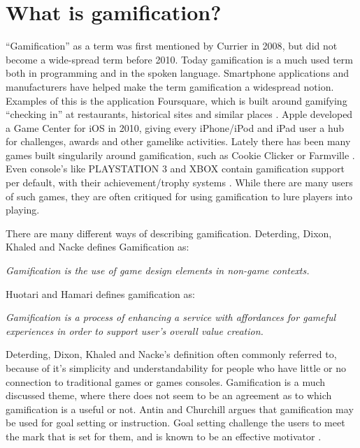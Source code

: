 \section{What is gamification?}
\label{sec:gamification}

``Gamification'' as a term was first mentioned by Currier in 2008\cite{gamificationcurrier}, but did not become a wide-spread term before 2010. Today gamification is a much used term both in programming and in the spoken language. Smartphone applications and manufacturers have helped make the term gamification a widespread notion. Examples of this is the application Foursquare, which is built around gamifying ``checking in'' at restaurants, historical sites and similar places \cite{foursquare}. Apple developed a Game Center for iOS in 2010, giving every iPhone/iPod and iPad user a hub for challenges, awards and other gamelike activities\cite{applegamecenter}. Lately there has been many games built singularily around gamification, such as Cookie Clicker \cite{cookieclicker} or Farmville \cite{farmville}. Even console's like PLAYSTATION 3 and XBOX contain gamification support per default, with their achievement/trophy systems \cite{xbox, playstation}. While there are many users of such games, they are often critiqued for using gamification to lure players into playing. 

There are many different ways of describing gamification. Deterding, Dixon, Khaled and Nacke\cite{Deterding:2011:GDE:2181037.2181040} defines Gamification as:

\textit{Gamification is the use of game design elements in non-game
contexts.}

Huotari and Hamari\cite{huotari2012defining} defines gamification as:

\textit{Gamification is a process of enhancing a service with affordances for gameful experiences in order to support user's overall value creation.}

Deterding, Dixon, Khaled and Nacke's definition often commonly referred to, because of it's simplicity and understandability for people who have little or no connection to traditional games or games consoles.
Gamification is a much discussed theme, where there does not seem to be an agreement as to which gamification is a useful or not. 
Antin and Churchill\cite{antin2011badges} argues that gamification may be used for goal setting or instruction. Goal setting challenge the users to meet the mark that is set for them, and is known to be an effective motivator \cite{ling2005using}. 

